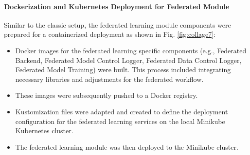 \paragraph{Dockerization and Kubernetes Deployment for Federated Module}
Similar to the classic setup, the federated learning module components were prepared for a containerized deployment as shown in Fig. \ref{fig:collage7}:
\begin{itemize}
    \item Docker images for the federated learning specific components (e.g., Federated Backend, Federated Model Control Logger, Federated Data Control Logger, Federated Model Training) were built. This process included integrating necessary libraries and adjustments for the federated workflow.
    \item These images were subsequently pushed to a Docker registry.
    \item Kustomization files were adapted and created to define the deployment configuration for the federated learning services on the local Minikube Kubernetes cluster.
    \item The federated learning module was then deployed to the Minikube cluster.
\end{itemize}

